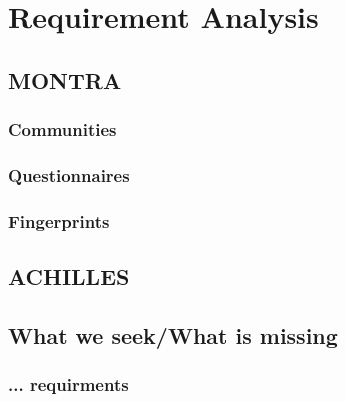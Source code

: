 \chapter{Requirement Analysis}
\label{chapter:requirement-analysis}

\section{MONTRA}

%
\subsection{Communities}
\subsection{Questionnaires}
\subsection{Fingerprints}

\section{ACHILLES}

\section{What we seek/What is missing}

\subsection{... requirments}

